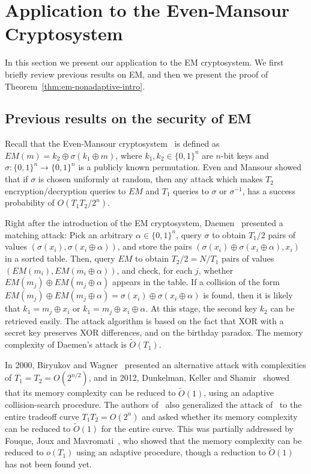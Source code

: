 \documentclass[11pt]{article}
\begin{document}
\section{Application to the Even-Mansour Cryptosystem}
\label{sec:EM}

In this section we present our application to the EM cryptosystem. We first briefly review previous results on EM, and then we present the proof of Theorem~\ref{thm:em-nonadaptive-intro}. 

\subsection{Previous results on the security of EM}

Recall that the Even-Mansour cryptosystem~\cite{EvenM97} is defined as $EM(m)=k_2 \oplus \sigma(k_1 \oplus m)$, where $k_1,k_2 \in \{0,1\}^n$ are $n$-bit keys and $\sigma:\{0,1\}^n \to \{0,1\}^n$ is a publicly known permutation. Even and Mansour showed that if $\sigma$ is chosen uniformly at random, then any attack which makes $T_2$ encryption/decryption queries to $EM$ and $T_1$ queries to $\sigma$ or $\sigma^{-1}$, has a success probability of $O(T_1 T_2 / 2^n)$. 

Right after the introduction of the EM cryptosystem, Daemen~\cite{Daemen91} presented a matching attack: Pick an arbitrary $\alpha \in \{0,1\}^n$, query $\sigma$ to obtain $T_1/2$ pairs of values $(\sigma(x_i),\sigma(x_i \oplus \alpha))$, and store the pairs $(\sigma(x_i) \oplus \sigma(x_i \oplus \alpha), x_i)$ in a sorted table. Then, query $EM$ to obtain $T_2/2=N/T_1$ pairs of values $(EM(m_i),EM(m_i \oplus \alpha))$, and check, for each $j$, whether $EM(m_j) \oplus EM(m_j \oplus \alpha)$ appears in the table. If a collision of the form $EM(m_j) \oplus EM(m_j \oplus \alpha)=\sigma(x_i) \oplus \sigma(x_i \oplus \alpha)$ is found, then it is likely that $k_1 = m_j \oplus x_i$ or $k_1=m_j \oplus x_i \oplus \alpha$. At this stage, the second key $k_2$ can be retrieved easily. The attack algorithm is based on the fact that XOR with a secret key preserves XOR differences, and on the birthday paradox.
The memory complexity of Daemen's attack is $\tilde{O}(T_1)$. 

In 2000, Biryukov and Wagner~\cite{BW00} presented an alternative attack with complexities of $T_1=T_2=O(2^{n/2})$, and in 2012, Dunkelman, Keller and Shamir~\cite{DKS15} showed that its memory complexity can be reduced to $\tilde{O}(1)$, using an adaptive collision-search procedure. The authors of~\cite{DKS15} also generalized the attack of~\cite{BW00} to the entire tradeoff curve $T_1 T_2 = O(2^n)$ and asked whether its memory complexity can be reduced to $\tilde{O}(1)$ for the entire curve. This was partially addressed by Fouque, Joux and Mavromati~\cite{FouqueJM14}, who showed that the memory complexity can be reduced to $o(T_1)$ using an adaptive procedure, though a reduction to $\tilde{O}(1)$ has not been found yet.
\end{document}
